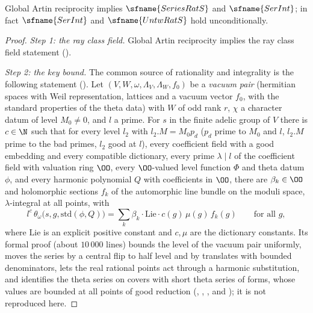 \begin{theorem}\label{pf:sh-div:series}
Global Artin reciprocity implies $\sfname{SeriesRatS}$ and $\sfname{SerInt}$; in fact $\sfname{SerInt}$ and $\sfname{UntwRatS}$ hold
unconditionally.
\end{theorem}

\begin{proof}
\emph{Step 1: the ray class field.} Global Artin reciprocity implies the ray class field statement
().

\emph{Step 2: the key bound.} The common source of rationality and integrality is the following statement
(). Let $(V,W,\omega,\Lambda_V,\Lambda_W,f_0)$ be a \emph{vacuum pair} (hermitian
spaces with Weil representation, lattices and a vacuum vector $f_0$, with the standard properties of the theta data) with $W$ of
odd rank $r$, $\chi$ a character datum of level $M_0\ne0$, and $l$ a prime. For $s$ in the finite adelic group of $V$ there is
$c\in\N$ such that for every level $l_2$ with $l_2.M=M_0p_d$ ($p_d$ prime to $M_0$ and $l$, $l_2.M$ prime to the bad primes, $l_2$ good
at $l$), every coefficient field with a good embedding and every compatible dictionary, every prime $\lambda\mid l$ of the
coefficient field with valuation ring $\OO$, every $\OO$-valued level function $\Phi$ and theta datum $\phi$, and every harmonic
polynomial $Q$ with coefficients in $\OO$, there are $\beta_k\in\OO$ and holomorphic sections $f_k$ of the automorphic line bundle on
the moduli space, $\lambda$-integral at all points, with
\[
l^c\,\theta_\omega\bigl(s,g,\mathrm{std}(\phi,Q)\bigr)=\sum_k\beta_k\cdot\mathrm{Lie}\cdot c(g)\,\mu(g)\,f_k(g)\qquad\text{for all }g,
\]
where $\mathrm{Lie}$ is an explicit positive constant and $c,\mu$ are the dictionary constants. Its formal proof (about $10\,000$ lines)
bounds the level of the vacuum pair uniformly, moves the series by a central flip to half level and by translates with bounded
denominators, lets the real rational points act through a harmonic substitution, and identifies the theta series on covers with
short theta series of forms, whose values are bounded at all points of good reduction
(, , , and );
it is not reproduced here.


\end{proof}
